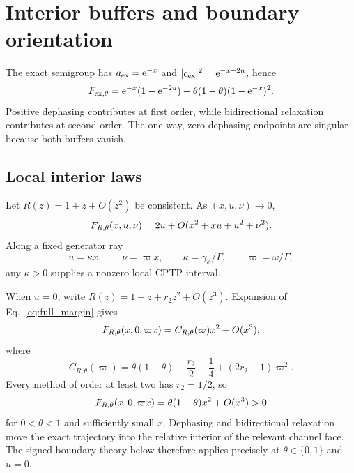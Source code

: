 \section{Interior buffers and boundary orientation}
\label{sec:local}

The exact semigroup has $a_{\rm ex}=\mathrm{e}^{-x}$ and $|c_{\rm ex}|^2=\mathrm{e}^{-x-2u}$, hence
\begin{equation}
 F_{{\rm ex},\theta}=\mathrm{e}^{-x}(1-\mathrm{e}^{-2u})
 +\theta(1-\theta)(1-\mathrm{e}^{-x})^2.
 \label{eq:exact_buffer}
\end{equation}
Positive dephasing contributes at first order, while bidirectional relaxation contributes at second order. The one-way, zero-dephasing endpoints are singular because both buffers vanish.

\subsection{Local interior laws}

Let $R(z)=1+z+O(z^2)$ be consistent. As $(x,u,\nu)\to0$,
\begin{equation}
 F_{R,\theta}(x,u,\nu)
 =2u+O(x^2+xu+u^2+\nu^2).
 \label{eq:dephasing_buffer}
\end{equation}
Along a fixed generator ray
\begin{equation}
 u=\kappa x,
 \qquad \nu=\varpi x,
 \qquad \kappa=\gamma_\phi/\Gamma,
 \qquad \varpi=\omega/\Gamma,
 \label{eq:generator_ray}
\end{equation}
any $\kappa>0$ supplies a nonzero local CPTP interval.

When $u=0$, write $R(z)=1+z+r_2z^2+O(z^3)$. Expansion of Eq.~\eqref{eq:full_margin} gives
\begin{equation}
 F_{R,\theta}(x,0,\varpi x)
 =C_{R,\theta}(\varpi)x^2+O(x^3),
 \label{eq:excitation_expansion}
\end{equation}
where
\begin{equation}
 C_{R,\theta}(\varpi)
 =\theta(1-\theta)+\frac{r_2}{2}-\frac14+(2r_2-1)\varpi^2.
 \label{eq:excitation_coeff}
\end{equation}
Every method of order at least two has $r_2=1/2$, so
\begin{equation}
 F_{R,\theta}(x,0,\varpi x)
 =\theta(1-\theta)x^2+O(x^3)>0
 \label{eq:excitation_buffer}
\end{equation}
for $0<\theta<1$ and sufficiently small $x$. Dephasing and bidirectional relaxation move the exact trajectory into the relative interior of the relevant channel face. The signed boundary theory below therefore applies precisely at $\theta\in\{0,1\}$ and $u=0$.

